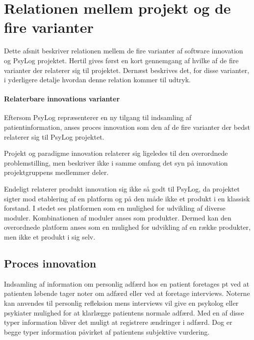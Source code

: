 \section{Relationen mellem projekt og de fire varianter}
Dette afsnit beskriver relationen mellem de fire varianter af software innovation\cite[Afsnit 5.1, Side 30-32]{art:essence} og PsyLog projektet.
Hertil gives først en kort gennemgang af hvilke af de fire varianter der relaterer sig til projektet.
Dernæst beskrives det, for disse varianter, i yderligere detalje hvordan denne relation kommer til udtryk.

\paragraph{Relaterbare innovations varianter}
Eftersom PsyLog repræsenterer en ny tilgang til indsamling af patientinformation, anses proces innovation som den af de fire varianter der bedst relaterer sig til PsyLog projektet.

Projekt og paradigme innovation relaterer sig ligeledes til den overordnede problemstilling, men beskriver ikke i samme omfang det syn på innovation projektgruppens medlemmer deler.

Endeligt relaterer produkt innovation sig ikke så godt til PsyLog, da projektet sigter mod etablering af en platform og på den måde ikke et produkt i en klassisk forstand.
I stedet ses platformen som en mulighed for udvikling af diverse moduler.
Kombinationen af moduler anses som produkter.
Dermed kan den overordnede platform anses som en mulighed for udvikling af en række produkter, men ikke et produkt i sig selv.


\subsection{Proces innovation}
Indsamling af information om personlig adfærd hos en patient foretages pt ved at patienten løbende tager noter om adfærd eller ved at foretage interviews.
Noterne kan anvendes til personlig refleksion mens interviews vil give en psykolog eller psykiater mulighed for at klarlægge patientens normale adfærd.
Med en af disse typer information bliver det muligt at registrere ændringer i adfærd.
Dog er begge typer information påvirket af patientens subjektive vurdering.

